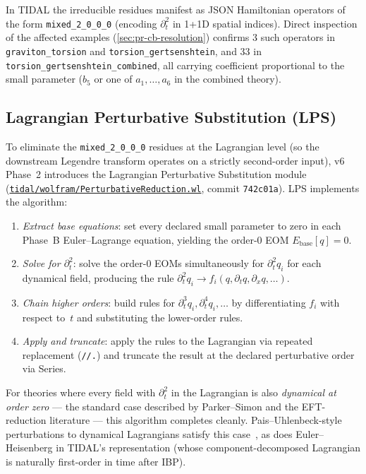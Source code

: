 In TIDAL the irreducible residues manifest as JSON Hamiltonian operators
of the form \texttt{mixed\_2\_0\_0\_0} (encoding $\partial_t^2$ in 1+1D
spatial indices).  Direct inspection of the affected examples
(\cref{sec:pr-cb-resolution}) confirms 3 such operators in
\texttt{graviton\_torsion} and \texttt{torsion\_gertsenshtein}, and 33 in
\texttt{torsion\_gertsenshtein\_combined}, all carrying coefficient
proportional to the small parameter ($b_5$ or one of $a_1,\dots,a_6$ in
the combined theory).

\subsection{Lagrangian Perturbative Substitution (LPS)}
\label{sec:pr-cb-lps}

To eliminate the \texttt{mixed\_2\_0\_0\_0} residues at the Lagrangian
level (so the downstream Legendre transform operates on a strictly
second-order input), v6 Phase~2 introduces the Lagrangian Perturbative
Substitution module
(\href{https://github.com/WilliamRoyce/tidal/blob/main/tidal/wolfram/PerturbativeReduction.wl}{\texttt{tidal/wolfram/PerturbativeReduction.wl}},
commit \texttt{742c01a}).  LPS implements the algorithm:

\begin{enumerate}
  \item \emph{Extract base equations}: set every declared small parameter to
        zero in each Phase~B Euler--Lagrange equation, yielding the order-0
        EOM $E_{\mathrm{base}}[q] = 0$.
  \item \emph{Solve for $\partial_t^2$}: solve the order-0 EOMs simultaneously
        for $\partial_t^2 q_i$ for each dynamical field, producing the rule
        $\partial_t^2 q_i \to f_i(q, \partial_t q, \partial_x q, \dots)$.
  \item \emph{Chain higher orders}: build rules for $\partial_t^3 q_i,
        \partial_t^4 q_i, \dots$ by differentiating $f_i$ with respect
        to~$t$ and substituting the lower-order rules.
  \item \emph{Apply and truncate}: apply the rules to the Lagrangian via
        repeated replacement (\verb|//.|) and truncate the result at the
        declared perturbative order via Series.
\end{enumerate}

For theories where every field with $\partial_t^2$ in the Lagrangian is also
\emph{dynamical at order zero} --- the standard case described by
Parker--Simon and the EFT-reduction literature --- this algorithm completes
cleanly.  Pais--Uhlenbeck-style perturbations to dynamical Lagrangians
satisfy this case~\cite{BenderMannheim2008,Woodard2015}, as does
Euler--Heisenberg in TIDAL's representation (whose component-decomposed
Lagrangian is naturally first-order in time after IBP).

